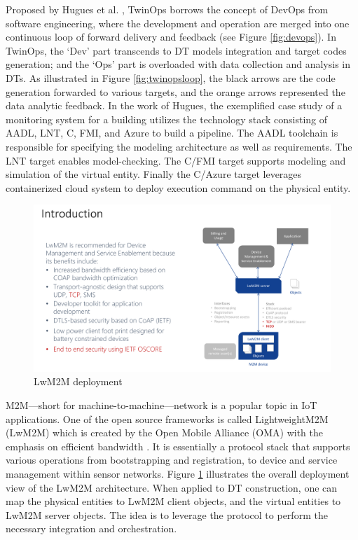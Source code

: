 \documentclass[journal,onecolumn]{IEEEtran} %
\begin{document}
Proposed by Hugues et al. \cite{Hugues2020}, TwinOps borrows the concept of DevOps \cite{Ebert2016} from software engineering, where the development and operation are merged into one continuous loop of forward delivery and feedback (see Figure \ref{fig:devops}). In TwinOps, the `Dev' part transcends to DT models integration and target codes generation; and the `Ops' part is overloaded with data collection and analysis in DTs. As illustrated in Figure \ref{fig:twinopsloop}, the black arrows are the code generation forwarded to various targets, and the orange arrows represented the data analytic feedback. In the work of Hugues, the exemplified case study of a monitoring system for a building utilizes the technology stack consisting of AADL, LNT, C, FMI, and Azure to build a pipeline. The AADL toolchain is responsible for specifying the modeling architecture as well as requirements. The LNT target enables model-checking. The C/FMI target supports modeling and simulation of the virtual entity. Finally the C/Azure target leverages containerized cloud system to deploy execution command on the physical entity.

\begin{figure}[hbt!]
  \centering
  \includegraphics[scale=0.6]{figures/lwm2m.pdf}
  \caption{LwM2M deployment \cite{oma2019}}
  \label{fig:lwm2m}
\end{figure}

M2M---short for machine-to-machine---network is a popular topic in IoT applications. One of the open source frameworks is called LightweightM2M (LwM2M) which is created by the Open Mobile Alliance (OMA) with the emphasis on efficient bandwidth \cite{oma2020}. It is essentially a protocol stack that supports various operations from bootstrapping and registration, to device and service management within sensor networks. Figure \ref{fig:lwm2m} illustrates the overall deployment view of the LwM2M architecture. When applied to DT construction, one can map the physical entities to LwM2M client objects, and the virtual entities to LwM2M server objects. The idea is to leverage the protocol to perform the necessary integration and orchestration. 
\end{document}
